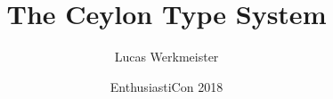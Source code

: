 \documentclass{beamer}
\title{The Ceylon Type System}
\author{Lucas Werkmeister}
\date{EnthusiastiCon 2018}
\begin{document}
\frame{\titlepage}
\end{document}
